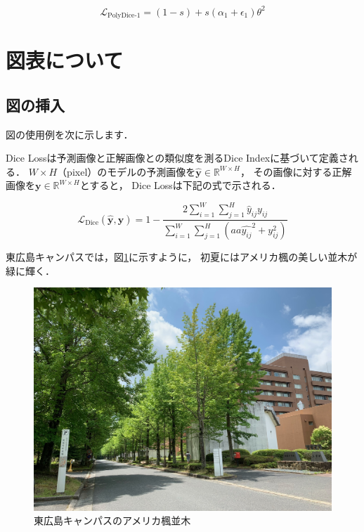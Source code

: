 \documentclass[10pt, a4paper, twocolumn]{jarticle}
\begin{document}
\begin{equation}
  \mathcal{L}_{\text{PolyDice-1}} = (1 - s) + s(\alpha_1 + \epsilon_1) \theta^2
\end{equation}

\newpage

\section{図表について}
\subsection{図の挿入}
図の使用例を次に示します．
\newline

Dice Lossは予測画像と正解画像との類似度を測るDice Indexに基づいて定義される．
$W \times H$（pixel）のモデルの予測画像を$\hat{\mathbf{y}} \in \mathbb R ^ {W \times H}$，
その画像に対する正解画像を$\mathbf{y} \in \mathbb R ^ {W \times H}$とすると，
Dice Lossは下記の式で示される．

\begin{equation}
  \mathcal{L}_{\text{Dice}}(\hat{\mathbf{y}}, \mathbf{y}) = 1 - \frac{2 \sum_{i=1}^{W} \sum_{j=1}^{H} \hat{y}_{ij} y_{ij}}{\sum_{i=1}^{W} \sum_{j=1}^{H} (aa \hat{y_{ij}} ^ 2 + y_{ij} ^ 2)}
\end{equation}


東広島キャンパスでは，図\ref{fig:campus}に示すように，
初夏にはアメリカ楓の美しい並木が緑に輝く．
%
\begin{figure}[t]
	\begin{center}
		\includegraphics[width=0.95\hsize]{figure/campus.jpg}
	\end{center}
	\vspace{-12pt} %
	\caption{東広島キャンパスのアメリカ楓並木}
	\label{fig:campus}
\end{figure}
%
\newline
\end{document}

